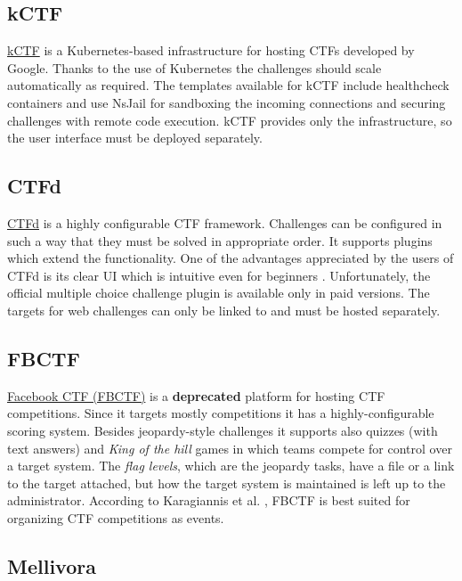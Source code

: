 \subsection{kCTF}

\href{https://github.com/google/kctf}{kCTF} is a Kubernetes-based infrastructure for hosting CTFs developed by Google. Thanks to the use of Kubernetes the challenges should scale automatically as required. The templates available for kCTF include healthcheck containers and use NsJail for sandboxing the incoming connections and securing challenges with remote code execution. kCTF provides only the infrastructure, so the user interface must be deployed separately.

\subsection{CTFd}
\label{ssec:CTFd}

\href{https://github.com/CTFd/CTFd}{CTFd} is a highly configurable CTF framework. Challenges can be configured in such a way that they must be solved in appropriate order. It supports plugins which extend the functionality. One of the advantages appreciated by the users of CTFd is its clear UI which is intuitive even for beginners \cite{bib:CTF-analysis, bib:bangladesh-CTFd}. Unfortunately, the official multiple choice challenge plugin is available only in paid versions. The targets for web challenges can only be linked to and must be hosted separately.

\subsection{FBCTF}
\label{ssec:FBCTF}

\href{https://github.com/facebookarchive/fbctf}{Facebook CTF (FBCTF)} is a \textbf{deprecated} platform for hosting CTF competitions. Since it targets mostly competitions it has a highly-configurable scoring system. Besides jeopardy-style challenges it supports also quizzes (with text answers) and \textit{King of the hill} games in which teams compete for control over a target system. The \textit{flag levels}, which are the jeopardy tasks, have a file or a link to the target attached, but how the target system is maintained is left up to the administrator. According to Karagiannis et al. \cite{bib:CTF-analysis}, FBCTF is best suited for organizing CTF competitions as events.

\subsection{Mellivora}

